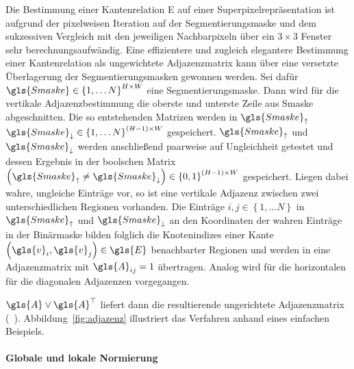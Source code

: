 Die Bestimmung einer Kantenrelation \gls{E} auf einer Superpixelrepräsentation ist aufgrund der pixelweisen Iteration auf der Segmentierungsmaske und dem sukzessiven Vergleich mit den jeweiligen Nachbarpixeln über ein $3 \times 3$ Fenster sehr berechnungsaufwändig.
Eine effizientere und zugleich elegantere Bestimmung einer Kantenrelation als ungewichtete Adjazenzmatrix kann über eine versetzte Überlagerung der Segmentierungsmasken gewonnen werden.
Sei dafür $\gls{Smaske} \in {\left\{1, \ldots N\right\}}^{H \times W}$ eine Segmentierungsmaske.
Dann wird für die vertikale Adjazenzbestimmung die oberste und unterste Zeile aus \gls{Smaske} abgeschnitten.
Die so entstehenden Matrizen werden in $\gls{Smaske}_{\uparrow}$ \bzw{} $\gls{Smaske}_{\downarrow} \in {\left\{1, \ldots N\right\}}^{\left(H-1\right) \times W}$ gespeichert.
$\gls{Smaske}_{\uparrow}$ und $\gls{Smaske}_{\downarrow}$ werden anschließend paarweise auf Ungleichheit getestet und dessen Ergebnis in der boolschen Matrix $\left(\gls{Smaske}_{\uparrow} \neq \gls{Smaske}_{\downarrow}\right) \in {\left\{0, 1\right\}}^{\left(H-1\right) \times W}$ gespeichert.
Liegen dabei wahre, \dhe{} ungleiche Einträge vor, so ist eine vertikale Adjazenz zwischen zwei unterschiedlichen Regionen vorhanden.
Die Einträge $i,j \in \left\{1, \ldots N \right\}$ in $\gls{Smaske}_{\uparrow}$ und $\gls{Smaske}_{\downarrow}$ an den Koordinaten der wahren Einträge in der Binärmaske bilden folglich die Knotenindizes einer Kante $\left(\gls{v}_i, \gls{v}_j\right) \in \gls{E}$ benachbarter Regionen und werden in eine Adjazenzmatrix mit $\gls{A}_{ij}=1$ übertragen.
Analog wird für die horizontalen \bzw{} für die diagonalen Adjazenzen vorgegangen.

$\gls{A} \vee \gls{A}^{\top}$ liefert dann die resultierende ungerichtete Adjazenzmatrix (\vgl{}~\cite{stackoverflow}).
Abbildung~\ref{fig:adjazenz} illustriert das Verfahren anhand eines einfachen Beispiels.

\paragraph{Globale und lokale Normierung}
\label{globale_lokale_normierung}

